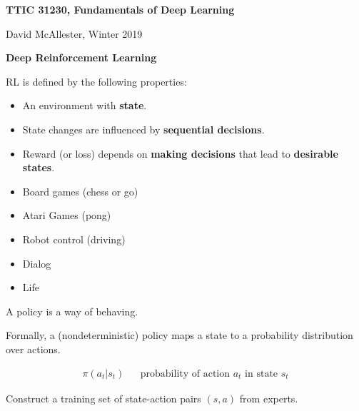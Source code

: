 




{\Huge

  \centerline{\bf TTIC 31230, Fundamentals of Deep Learning}
  \bigskip
  \centerline{David McAllester, Winter 2019}
\vfill
  \centerline{\bf Deep Reinforcement Learning}
  \vfill
\vfill


RL is defined by the following properties:

\vfill
\begin{itemize}
\item An environment with {\bf state}.

  \vfill
\item State changes are influenced by {\bf sequential decisions}.

  \vfill
\item  Reward (or loss) depends on {\bf making decisions} that lead to {\bf desirable states}.
\end{itemize}


\begin{itemize}
\item Board games (chess or go)

  \vfill
\item Atari Games (pong)

  \vfill
\item Robot control (driving)

  \vfill
\item Dialog

  \vfill
\item Life

\end{itemize}


A policy is a way of behaving.

\vfill
Formally, a (nondeterministic) policy maps a state to a probability distribution over actions.

\vfill
\begin{eqnarray*}
    \pi(a_t|s_t) & & \mbox{probability of action $a_t$ in state $s_t$}
\end{eqnarray*}


Construct a training set of state-action pairs $(s,a)$ from experts.

}
